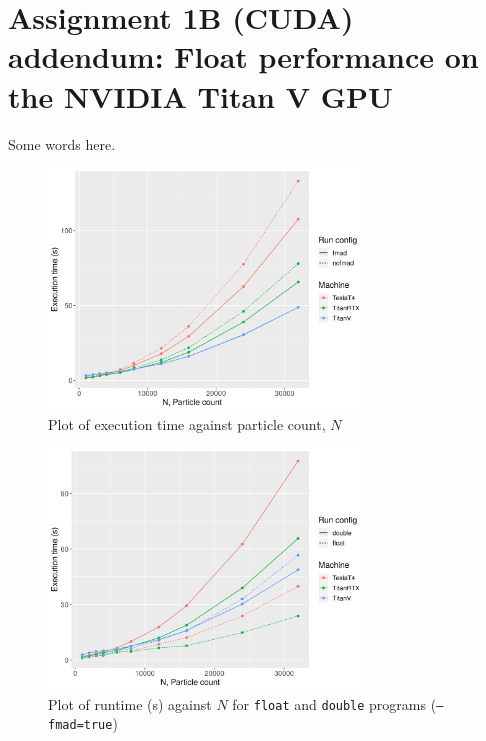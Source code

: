 \documentclass[12pt]{article}
\begin{document}
\pagebreak

\section{Assignment 1B (CUDA) addendum: Float performance on the NVIDIA Titan V GPU}

Some words here.

\begin{figure}[H]
    \centering
    \includegraphics[width=0.75\textwidth]{gpu-varyN}
    \caption{Plot of execution time against particle count, $N$}
    \label{fig:gpu-varyN}
\end{figure}

\begin{figure}[H]
    \centering
    \includegraphics[width=0.75\textwidth]{double-float-comparison-fmad}
    \caption{Plot of runtime (s) against $N$ for \texttt{float} and \texttt{double} programs (\texttt{--fmad=true})}
    \label{fig:double-float-comparison-fmad}
\end{figure}
\end{document}
